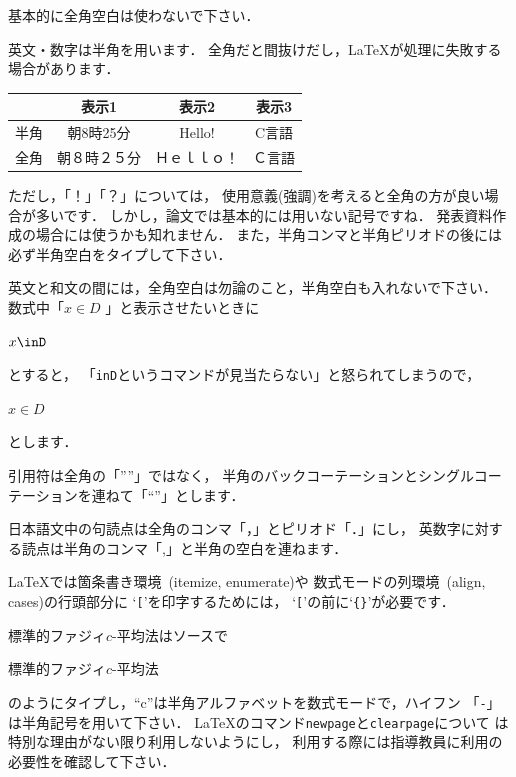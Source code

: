 \documentclass[a4j,12pt,dvipdfmx,oneside]{jsbook}
\theoremstyle{definition}
\begin{document}
基本的に全角空白は使わないで下さい．

英文・数字は半角を用います．
全角だと間抜けだし，\LaTeX{}が処理に失敗する場合があります．
\begin{center}
\begin{tabular}{c|c|c|c}
\hline
&表示1&表示2&表示3\\
\hline\hline
半角&朝8時25分&Hello!&C言語\\
全角&朝８時２５分&Ｈｅｌｌｏ！&Ｃ言語\\
\hline
\end{tabular}
\end{center}
ただし，「！」「？」については，
使用意義(強調)を考えると全角の方が良い場合が多いです．
しかし，論文では基本的には用いない記号ですね．
発表資料作成の場合には使うかも知れません．
また，半角コンマと半角ピリオドの後には必ず半角空白をタイプして下さい．

英文と和文の間には，全角空白は勿論のこと，半角空白も入れないで下さい．
数式中「$x\in{}D$ 」と表示させたいときに
\begin{verbatimtab}
$x\inD$
\end{verbatimtab}
とすると，
「\texttt{\textyen{}inD}というコマンドが見当たらない」と怒られてしまうので，
\begin{verbatimtab}
$x\in{}D$
\end{verbatimtab}
とします．

引用符は全角の「””」ではなく，
半角のバックコーテーションとシングルコーテーションを連ねて「``''」とします．

日本語文中の句読点は全角のコンマ「，」とピリオド「．」にし，
英数字に対する読点は半角のコンマ「,」と半角の空白を連ねます．

\LaTeX では箇条書き環境~(itemize, enumerate)や
数式モードの列環境~(align, cases)の行頭部分に
`\texttt{[}'を印字するためには，
`\texttt{[}'の前に`\texttt{\{\}}'が必要です．

標準的ファジィ$c$-平均法はソースで
\begin{verbatimtab}
標準的ファジィ$c$-平均法
\end{verbatimtab}
のようにタイプし，``c''は半角アルファベットを数式モードで，ハイフン
「\texttt{-}」は半角記号を用いて下さい．
\LaTeX{}のコマンド\texttt{\yen{}newpage}と\texttt{\yen{}clearpage}について
は特別な理由がない限り利用しないようにし，
利用する際には指導教員に利用の必要性を確認して下さい．
%
%
%
\end{document}
